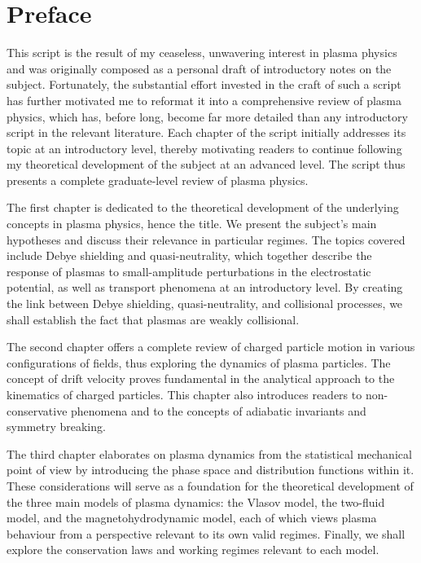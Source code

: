\chapter*{Preface}


This script is the result of my ceaseless, unwavering interest in plasma physics and was originally composed as a personal draft of introductory notes on the subject. Fortunately, the substantial effort invested in the craft of such a script has further motivated me to reformat it into a comprehensive review of plasma physics, which has, before long, become far more detailed than any introductory script in the relevant literature. Each chapter of the script initially addresses its topic at an introductory level, thereby motivating readers to continue following my theoretical development of the subject at an advanced level. The script thus presents a complete graduate-level review of plasma physics.

\quad The first chapter is dedicated to the theoretical development of the underlying concepts in plasma physics, hence the title. We present the subject's main hypotheses and discuss their relevance in particular regimes. The topics covered include Debye shielding and quasi-neutrality, which together describe the response of plasmas to small-amplitude perturbations in the electrostatic potential, as well as transport phenomena at an introductory level. By creating the link between Debye shielding, quasi-neutrality, and collisional processes, we shall establish the fact that plasmas are weakly collisional.

\quad The second chapter offers a complete review of charged particle motion in various configurations of fields, thus exploring the dynamics of plasma particles. The concept of drift velocity proves fundamental in the analytical approach to the kinematics of charged particles. This chapter also introduces readers to non-conservative phenomena and to the concepts of adiabatic invariants and symmetry breaking.

\quad The third chapter elaborates on plasma dynamics from the statistical mechanical point of view by introducing the phase space and distribution functions within it. These considerations will serve as a foundation for the theoretical development of the three main models of plasma dynamics: the Vlasov model, the two-fluid model, and the magnetohydrodynamic model, each of which views plasma behaviour from a perspective relevant to its own valid regimes. Finally, we shall explore the conservation laws and working regimes relevant to each model.


